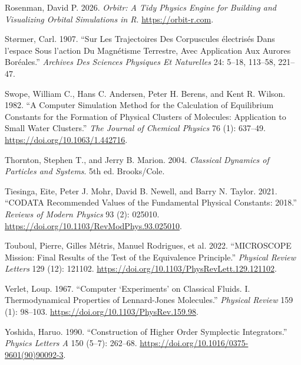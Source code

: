 \documentclass[
  10.5pt,
  letterpaper,
]{scrbook}
\newlength{\cslhangindent}
\newenvironment{CSLReferences}[2] %
 {\begin{list}{}{%
  \setlength{\itemindent}{0pt}
  \setlength{\leftmargin}{0pt}
  \setlength{\parsep}{0pt}
  \ifodd #1
   \setlength{\leftmargin}{\cslhangindent}
   \setlength{\itemindent}{-1\cslhangindent}
  \fi
  \setlength{\itemsep}{#2\baselineskip}}}
 {\end{list}}
\theoremstyle{definition}
\theoremstyle{plain}
\theoremstyle{remark}
\begin{document}
\begin{CSLReferences}{1}{1}
Rosenman, David P. 2026. \emph{Orbitr: A Tidy Physics Engine for
Building and Visualizing Orbital Simulations in {R}}.
\url{https://orbit-r.com}.

Størmer, Carl. 1907. {``Sur Les Trajectoires Des Corpuscules
{é}lectris{é}s Dans l'espace Sous l'action Du Magn{é}tisme Terrestre,
Avec Application Aux Aurores Bor{é}ales.''} \emph{Archives Des Sciences
Physiques Et Naturelles} 24: 5--18, 113--58, 221--47.

Swope, William C., Hans C. Andersen, Peter H. Berens, and Kent R.
Wilson. 1982. {``A Computer Simulation Method for the Calculation of
Equilibrium Constants for the Formation of Physical Clusters of
Molecules: Application to Small Water Clusters.''} \emph{The Journal of
Chemical Physics} 76 (1): 637--49.
\url{https://doi.org/10.1063/1.442716}.

Thornton, Stephen T., and Jerry B. Marion. 2004. \emph{Classical
Dynamics of Particles and Systems}. 5th ed. Brooks/Cole.

Tiesinga, Eite, Peter J. Mohr, David B. Newell, and Barry N. Taylor.
2021. {``{CODATA} Recommended Values of the Fundamental Physical
Constants: 2018.''} \emph{Reviews of Modern Physics} 93 (2): 025010.
\url{https://doi.org/10.1103/RevModPhys.93.025010}.

{Touboul, Pierre, Gilles Métris, Manuel Rodrigues, et al.} 2022.
{``{MICROSCOPE} Mission: Final Results of the Test of the Equivalence
Principle.''} \emph{Physical Review Letters} 129 (12): 121102.
\url{https://doi.org/10.1103/PhysRevLett.129.121102}.

Verlet, Loup. 1967. {``Computer {`Experiments'} on Classical Fluids.
{I}. {Thermodynamical} Properties of {Lennard-Jones} Molecules.''}
\emph{Physical Review} 159 (1): 98--103.
\url{https://doi.org/10.1103/PhysRev.159.98}.

Yoshida, Haruo. 1990. {``Construction of Higher Order Symplectic
Integrators.''} \emph{Physics Letters A} 150 (5--7): 262--68.
\url{https://doi.org/10.1016/0375-9601(90)90092-3}.

\end{CSLReferences}

\cleardoublepage
{}
{}
\appendix
\end{document}
